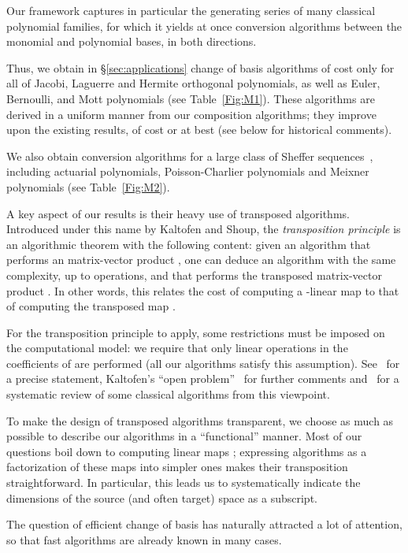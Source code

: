 \documentclass{sig-alternate}
\begin{document}
\smallskip{} Our framework captures in
particular the generating series of many classical polynomial
families, for which it yields at once conversion algorithms between
the monomial and polynomial bases, in both directions.

Thus, we obtain in \S\ref{sec:applications} change of basis
algorithms of cost only  for all of Jacobi, Laguerre and
Hermite orthogonal polynomials, as well as Euler, Bernoulli, and Mott
polynomials (see Table~\ref{Fig:M1}). These algorithms are derived
in a uniform manner from our composition algorithms; they improve upon
the existing results, of cost  or  at best (see below for historical comments).

We also obtain  conversion algorithms for a large
class of Sheffer sequences~\cite[Chap.~2]{Roman05}, including
actuarial polynomials, Poisson-Charlier polynomials and Meix\-ner
polynomials (see Table~\ref{Fig:M2}).

\smallskip{} A key aspect of our results is
their heavy use of transposed algorithms. Introduced under this name
by Kaltofen and Shoup, the \emph{transposition principle} is an
algorithmic theorem with the following content: given an algorithm
that performs an  matrix-vector product ,
one can deduce an algorithm with the same complexity, up to 
operations, and that performs the transposed matrix-vector product . In other words, this relates the cost of computing a
-linear map  to that of computing the transposed map
.

For the transposition principle to apply, some restrictions must be
imposed on the computational model: we require that only linear
operations in the coefficients of  are performed (all our
algorithms satisfy this assumption). See~\cite{BuClSh97} for a precise
statement, Kaltofen's ``open problem''~\cite{Kaltofen00} for further
comments and~\cite{BoLeSc03} for a systematic review of some classical
algorithms from this viewpoint.

To make the design of transposed algorithms transparent, we choose as
much as possible to describe our algorithms in a ``functional''
manner. Most of our questions boil down to computing linear maps
; expressing algorithms as a factorization of
these maps into simpler ones makes their transposition
straightforward. In particular, this leads us to systematically
indicate the dimensions of the source (and often target) space as
a subscript.

\smallskip{} The question of efficient
change of basis has naturally attracted a lot of attention, so that
fast algorithms are already known in many cases.
\end{document}

